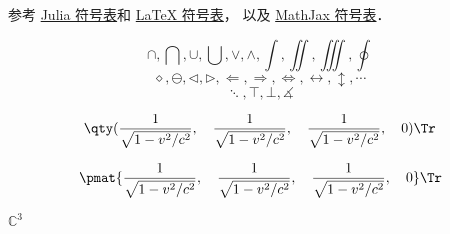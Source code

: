 
参考 \href{https://docs.julialang.org/en/v1/manual/unicode-input/}{Julia 符号表}和 \href{https://oeis.org/wiki/List_of_LaTeX_mathematical_symbols}{LaTeX 符号表}， 以及 \href{http://www.onemathematicalcat.org/MathJaxDocumentation/TeXSyntax.htm#U}{MathJax 符号表}．

\begin{equation}
\cap, \bigcap, \cup, \bigcup, \vee, \wedge, \int, \iint, \iiint, \oint
\end{equation}
\begin{equation}
\diamond, \ominus, \triangleleft, \triangleright, \Longleftarrow, \Longrightarrow, \iff, \leftrightarrow, \updownarrow, \cdots
\end{equation}
\begin{equation}
\ddots, \top, \bot, \measuredangle
\end{equation}

\begin{equation}
\qty(\frac{1}{\sqrt{1-v^2/c^2}}, \quad \frac{1}{\sqrt{1-v^2/c^2}}, \quad \frac{1}{\sqrt{1-v^2/c^2}}, \quad 0)\Tr
\end{equation}

\begin{equation}
\pmat{\frac{1}{\sqrt{1-v^2/c^2}}, \quad \frac{1}{\sqrt{1-v^2/c^2}}, \quad \frac{1}{\sqrt{1-v^2/c^2}}, \quad 0}\Tr
\end{equation}

$\mathbb C^3$